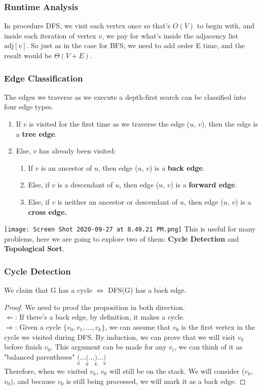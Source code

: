 \documentclass[a4paper]{article}
\renewcommand{\sb}{\vspace*{4px} \\}
\begin{document}
\subsubsection*{Runtime Analysis} 
In procedure DFS, we visit each vertex once so that's $O(V)$ to begin with, 
and inside each iteration of vertex $v$, we pay for what's inside the 
adjacency list $\text{adj}[v]$. So just as in the case for BFS, we need to add 
order E time, and the result would be $\Theta(V + E)$.
%
\subsubsection*{Edge Classification}
The edges we traverse as we execute a depth-first search can be classified 
into four edge types. \begin{enumerate}[1.]
    \item If $v$ is visited for the first time as we traverse the edge 
    ($u$, $v$), then the edge is a \textbf{tree edge}.
    \item Else, $v$ has already been visited: \begin{enumerate}
        \item If $v$ is an ancestor of $u$, then edge ($u$, $v$) is a \textbf{back edge}.
        \item Else, if $v$ is a descendant of $u$, then edge ($u$, $v$) is a \textbf{forward edge}.
        \item Else, if $v$ is neither an ancestor or descendant of $u$, then edge ($u$, $v$) is a \textbf{cross edge.}
    \end{enumerate}
\end{enumerate}
\texttt{[image: Screen Shot 2020-09-27 at 8.49.21 PM.png]}
This is useful for many problems, here we are going to explore two of 
them: \textbf{Cycle Detection} and \textbf{Topological Sort}.

\subsubsection*{Cycle Detection}
We claim that G has a cycle $\Leftrightarrow$ DFS(G) has a back edge.
\begin{proof}
    We need to proof the proposition in both direction. \sb
    $\Leftarrow$: If there's a back edge, by definition, it makes a cycle. \sb
    $\Rightarrow$: Given a cycle $\{v_0, v_1, \dots, v_k\}$, we can assume that 
    $v_0$ is the first vertex in the cycle we visited during DFS. By induction, 
    we can prove that we will visit $v_k$ before finish $v_0$. This argument can 
    be made for any $v_i$, we can think of it as "balanced parentheses"
    $\underset{u}{(} \dots \underset{k}{(} \dots \underset{k}{)} \dots \underset{u}{)}$
    \sb 
    Therefore, when we visited $v_k$, $v_0$ will still be on the stack. We will 
    consider ($v_k$, $v_0$), and because $v_0$ is still being processed, we will 
    mark it as a back edge.
\end{proof}
\end{document}
